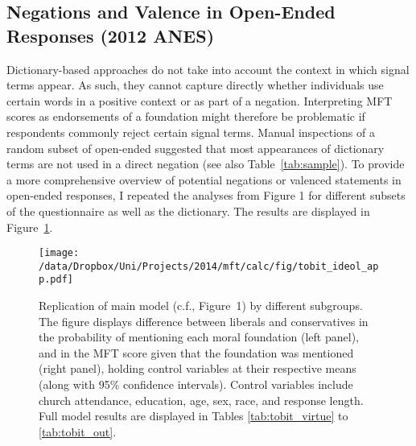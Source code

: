 \clearpage
\subsection{Negations and Valence in Open-Ended Responses (2012 ANES)}

Dictionary-based approaches do not take into account the context in which signal terms appear. As such, they cannot capture directly whether individuals use certain words in a positive context or as part of a negation. Interpreting MFT scores as endorsements of a foundation might therefore be problematic if respondents commonly reject certain signal terms. Manual inspections of a random subset of open-ended suggested that most appearances of dictionary terms are not used in a direct negation (see also Table~\ref{tab:sample}). To provide a more comprehensive overview of potential negations or valenced statements in open-ended responses, I repeated the analyses from Figure 1 for different subsets of the questionnaire as well as the dictionary. The results are displayed in Figure~\ref{fig:tobit_ideol_app}.

\begin{figure}[ht]\centering
\texttt{[image: /data/Dropbox/Uni/Projects/2014/mft/calc/fig/tobit\_ideol\_app.pdf]}
\caption[Replication of main model predicting MFT scores based on ideology by different subgroups]{Replication of main model (c.f., Figure~1) by different subgroups. The figure displays difference between liberals and conservatives in the probability of mentioning each moral foundation (left panel), and in the MFT score given that the foundation was mentioned (right panel), holding control variables at their respective means (along with 95\% confidence intervals). Control variables include church attendance, education, age, sex, race, and response length. Full model results are displayed in Tables \ref{tab:tobit_virtue} to \ref{tab:tobit_out}.
}\label{fig:tobit_ideol_app}
\end{figure}

